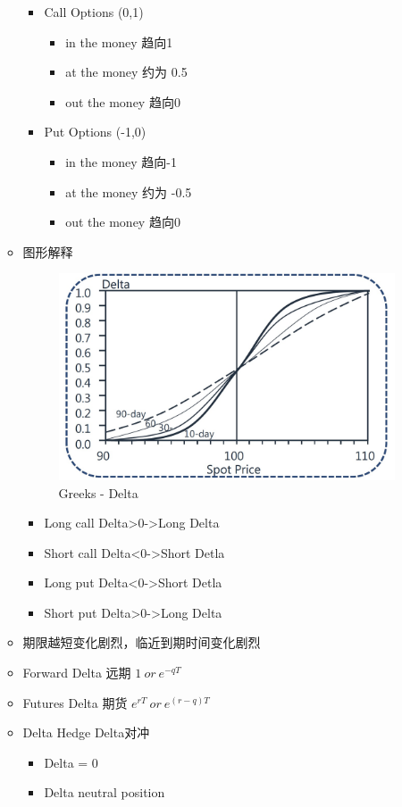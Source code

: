 \documentclass[a4paper,6pt,twoside,openany]{article}
\begin{document}
\begin{itemize}
\begin{itemize}
\begin{itemize}
    \item Call Options (0,1)
      \begin{itemize}
      \item in the money 趋向1
      \item at the money 约为 0.5
      \item out the money 趋向0
      \end{itemize}
    \item Put Options (-1,0)
      \begin{itemize}
      \item in the money 趋向-1
      \item at the money 约为 -0.5
      \item out the money 趋向0
      \end{itemize}
    \end{itemize}
  \item 图形解释
     \begin{figure}[ht!]
      \centering \includegraphics[width=100mm]{Greeks_Delta.jpg}
      \caption{Greeks - Delta}
    \end{figure}
    \begin{itemize}
    \item Long call Delta>0->Long Delta
    \item Short call Delta<0->Short Detla
    \item Long put Delta<0->Short Detla
    \item Short put Delta>0->Long Delta
    \end{itemize}
  \item 期限越短变化剧烈，临近到期时间变化剧烈
  \item Forward Delta 远期 $1 \ or\ e^{-qT}$
  \item Futures Delta 期货 $e^{rT} \ or\ e^{(r - q)T}$
  \item Delta Hedge Delta对冲
    \begin{itemize}
    \item Delta = 0
    \item Delta neutral position
    \end{itemize}
  \end{itemize}
  

\end{itemize}
\end{document}
